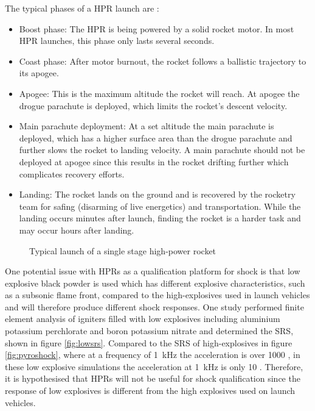 \documentclass{report}
\begin{document}
The typical phases of a HPR launch are \cite{canepa2005modern}:

\begin{itemize} %
  \item Boost phase: The HPR is being powered by a solid rocket motor. In most HPR launches, this phase only lasts several seconds.
  \item Coast phase: After motor burnout, the rocket follows a ballistic trajectory to its apogee.
  \item Apogee: This is the maximum altitude the rocket will reach. At apogee the drogue parachute is deployed, which limits the rocket's descent velocity.
  \item Main parachute deployment: At a set altitude the main parachute is deployed, which has a higher surface area than the drogue parachute and further slows the rocket to landing velocity. A main parachute should not be deployed at apogee since this results in the rocket drifting further which complicates recovery efforts.
  \item Landing: The rocket lands on the ground and is recovered by the rocketry team for safing (disarming of live energetics) and transportation. While the landing occurs minutes after launch, finding the rocket is a harder task and may occur hours after landing.
\end{itemize}

\begin{figure}[H]
  \centering
  
  \caption{Typical launch of a single stage high-power rocket}
  \label{fig:rocket_flight}
\end{figure}

One potential issue with HPRs as a qualification platform for shock is that low explosive black powder is used \cite{canepa2005modern} which has different explosive characteristics, such as a subsonic flame front, compared to the high-explosives used in launch vehicles \cite{bement1995manual} and will therefore produce different shock responses. One study \cite{wang2023numerical} performed finite element analysis of igniters filled with low explosives including aluminium potassium perchlorate and boron potassium nitrate and determined the SRS, shown in figure \ref{fig:lowsrs}. Compared to the SRS of high-explosives in figure \ref{fig:pyroshock}, where at a frequency of \SI{1}{\kilo\hertz} the acceleration is over \SI{1000}{\gacc} \cite{nasa-pyroshock}, in these low explosive simulations the acceleration at \SI{1}{\kilo\hertz} is only \SI{10}{\gacc} \cite{wang2023numerical}. Therefore, it is hypothesised that HPRs will not be useful for shock qualification since the response of low explosives is different from the high explosives used on launch vehicles.
\end{document}

